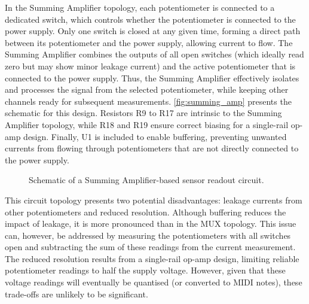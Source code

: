 \documentclass[12pt]{article}
\numberwithin{subsubsubsection}{subsubsection}
\begin{document}
In the Summing Amplifier topology, each potentiometer is connected to a dedicated switch, which controls whether the potentiometer is connected to the power supply. Only one switch is closed at any given time, forming a direct path between its potentiometer and the power supply, allowing current to flow. The Summing Amplifier combines the outputs of all open switches (which ideally read zero but may show minor leakage current) and the active potentiometer that is connected to the power supply. Thus, the Summing Amplifier effectively isolates and processes the signal from the selected potentiometer, while keeping other channels ready for subsequent measurements.
\newpage
\autoref{fig:summing_amp} presents the schematic for this design. Resistors R9 to R17 are intrinsic to the Summing Amplifier topology, while R18 and R19 ensure correct biasing for a single-rail op-amp design. Finally, U1 is included to enable buffering, preventing unwanted currents from flowing through potentiometers that are not directly connected to the power supply.  

\begin{figure}[H]
    \centering
    \caption{Schematic of a Summing Amplifier-based sensor readout circuit.}
    \label{fig:summing_amp}
\end{figure}


This circuit topology presents two potential disadvantages: leakage currents from other potentiometers and reduced resolution. Although buffering reduces the impact of leakage, it is more pronounced than in the MUX topology. This issue can, however, be addressed by measuring the potentiometers with all switches open and subtracting the sum of these readings from the current measurement. The reduced resolution results from a single-rail op-amp design, limiting reliable potentiometer readings to half the supply voltage. However, given that these voltage readings will eventually be quantised (or converted to MIDI notes), these trade-offs are unlikely to be significant.
\end{document}
